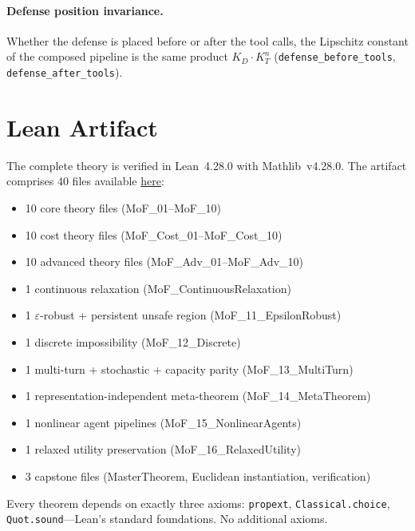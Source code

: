 \documentclass[11pt]{article}
\begin{document}
\paragraph{Defense position invariance.}
Whether the defense is placed before or after the tool calls, the Lipschitz constant of the composed pipeline is the same product $K_D \cdot K_T^n$ (\texttt{defense\_before\_tools}, \texttt{defense\_after\_tools}).

\section{Lean Artifact}
\label{app:artifact}

The complete theory is verified in Lean~4.28.0 with Mathlib~v4.28.0.
The artifact comprises 40 files available \href{https://github.com/mbhatt1/stuff/tree/main/ManifoldProofs}{here}:
\begin{itemize}[nosep]
  \item 10 core theory files (MoF\_01--MoF\_10)
  \item 10 cost theory files (MoF\_Cost\_01--MoF\_Cost\_10)
  \item 10 advanced theory files (MoF\_Adv\_01--MoF\_Adv\_10)
  \item 1 continuous relaxation (MoF\_ContinuousRelaxation)
  \item 1 $\varepsilon$-robust + persistent unsafe region
    (MoF\_11\_EpsilonRobust)
  \item 1 discrete impossibility (MoF\_12\_Discrete)
  \item 1 multi-turn + stochastic + capacity parity
    (MoF\_13\_MultiTurn)
  \item 1 representation-independent meta-theorem
    (MoF\_14\_MetaTheorem)
  \item 1 nonlinear agent pipelines (MoF\_15\_NonlinearAgents)
  \item 1 relaxed utility preservation (MoF\_16\_RelaxedUtility)
  \item 3 capstone files (MasterTheorem, Euclidean instantiation,
    verification)
\end{itemize}

Every theorem depends on exactly three axioms: \texttt{propext},
\texttt{Classical.choice}, \texttt{Quot.sound}---Lean's standard
foundations. No additional axioms.
\end{document}
